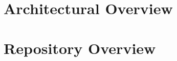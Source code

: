 






\label{sec:3}

\section{Architectural Overview}
\label{sec:architectural-overview}

\section{Repository Overview}
\label{sec:repository-overview}

